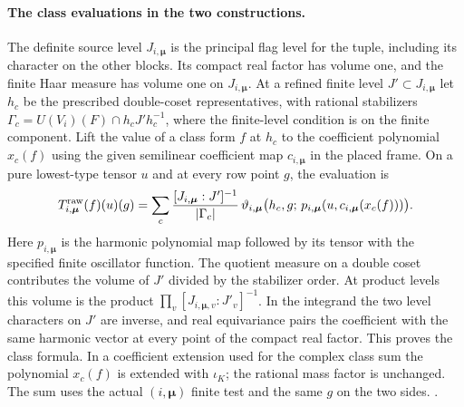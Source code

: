 \paragraph{The class evaluations in the two constructions.}
The definite source level \(J_{i,\boldsymbol\mu}\) is the principal
flag level for the tuple, including its character on the other
blocks. Its compact real factor has volume one, and the finite Haar
measure has volume one on \(J_{i,\boldsymbol\mu}\). At a refined
finite level \(J'\subset J_{i,\boldsymbol\mu}\) let \(h_c\) be the
prescribed double-coset representatives, with rational stabilizers
\(\Gamma_c=U(V_i)(F)\cap h_cJ'h_c^{-1}\), where the finite-level
condition is on the finite component. Lift the value of a class
form \(f\) at \(h_c\) to the coefficient polynomial \(x_c(f)\)
using the given semilinear coefficient map \(c_{i,\boldsymbol\mu}\)
in the placed frame. On a pure lowest-type tensor \(u\) and at
every row point \(g\), the evaluation is
\begin{equation}
 \label{eq:period-auxiliary-class-evaluation}
 T^{\rm raw}_{i,\boldsymbol\mu}(f)(u)(g)
 =\sum_c
   \frac{[J_{i,\boldsymbol\mu}:J']^{-1}}{|\Gamma_c|}
   \,\vartheta_{i,\boldsymbol\mu}
     \bigl(h_c,g;\,p_{i,\boldsymbol\mu}
            (u,c_{i,\boldsymbol\mu}(x_c(f)))\bigr).
\end{equation}
Here \(p_{i,\boldsymbol\mu}\) is the harmonic polynomial map
followed by its tensor with the specified finite oscillator
function. The quotient measure on a double coset contributes
the volume of \(J'\) divided by the stabilizer order. At
product levels this volume is the product
\(\prod_v[J_{i,\boldsymbol\mu,v}:J'_v]^{-1}\).
In the integrand the two level characters on \(J'\) are inverse, and
real equivariance pairs the coefficient with the same harmonic
vector at every point of the compact real factor. This proves the
class formula. In a coefficient extension used for the complex class
sum the polynomial \(x_c(f)\) is extended with \(\iota_K\); the
rational mass factor is unchanged. The sum uses the actual
\((i,\boldsymbol\mu)\) finite test and the same \(g\) on the
two sides.
.


